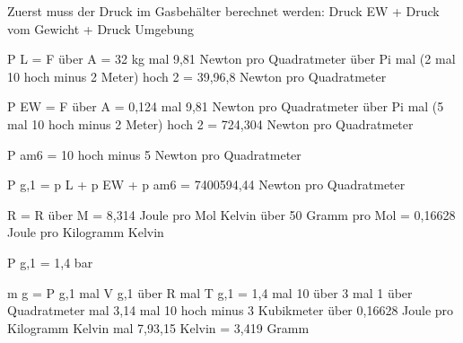 Zuerst muss der Druck im Gasbehälter berechnet werden:  
Druck EW + Druck vom Gewicht + Druck Umgebung  

P L = F über A = 32 kg mal 9,81 Newton pro Quadratmeter über Pi mal (2 mal 10 hoch minus 2 Meter) hoch 2 = 39,96,8 Newton pro Quadratmeter  

P EW = F über A = 0,124 mal 9,81 Newton pro Quadratmeter über Pi mal (5 mal 10 hoch minus 2 Meter) hoch 2 = 724,304 Newton pro Quadratmeter  

P am6 = 10 hoch minus 5 Newton pro Quadratmeter  

P g,1 = p L + p EW + p am6 = 7400594,44 Newton pro Quadratmeter  

R = R über M = 8,314 Joule pro Mol Kelvin über 50 Gramm pro Mol = 0,16628 Joule pro Kilogramm Kelvin  

P g,1 = 1,4 bar  

m g = P g,1 mal V g,1 über R mal T g,1 = 1,4 mal 10 über 3 mal 1 über Quadratmeter mal 3,14 mal 10 hoch minus 3 Kubikmeter über 0,16628 Joule pro Kilogramm Kelvin mal 7,93,15 Kelvin = 3,419 Gramm